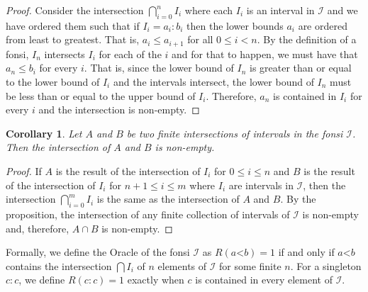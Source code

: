 \documentclass[12pt]{article}
\newtheorem{corollary}{Corollary}
\theoremstyle{remark}
\newcommand{\lt}{\mathord{<}}
\begin{document}
\begin{proof} 
    Consider the intersection $\bigcap_{i=0}^n I_i$ where each $I_i$ is an interval in $\mathcal{I}$ and we have ordered them such that if $I_i = a_i : b_i$ then the lower bounds $a_i$ are ordered from least to greatest. That is,  $a_i \leq a_{i+1}$ for all $0 \leq i < n$. By the definition of a fonsi, $I_n$ intersects $I_i$ for each of the $i$ and for that to happen, we must have that $a_n \leq b_i$ for every $i$. That is, since the lower bound of $I_n$ is greater than or equal to the lower bound of $I_i$ and the intervals intersect, the lower bound of $I_n$ must be less than or equal to the upper bound of $I_i$. Therefore, $a_n$ is contained in $I_i$ for every $i$ and the intersection is non-empty. 
\end{proof}


\begin{corollary}
Let $A$ and $B$ be two finite intersections of intervals in the fonsi $\mathcal{I}$. Then the intersection of $A$ and $B$ is non-empty.
\end{corollary}

\begin{proof}
    If $A$ is the result of the intersection of $I_i$ for $0 \leq i \leq n$ and $B$ is the result of the intersection of $I_i$ for $n+1 \leq i \leq m$ where $I_i$ are intervals in $\mathcal{I}$, then the intersection $\bigcap_{i=0}^m I_i$ is the same as the intersection of $A$ and $B$. By the proposition, the intersection of any finite collection of intervals of $\mathcal{I}$ is non-empty and, therefore, $A \cap B$ is non-empty. 
\end{proof}


Formally, we define the Oracle of the fonsi $\mathcal{I}$ as $R(a \lt b) = 1$ if and only if $a \lt b$ contains the intersection $\bigcap I_i$ of $n$ elements of $\mathcal{I}$ for some finite $n$. For a singleton $c:c$, we define $R(c:c) = 1$ exactly when $c$ is contained in every element of $\mathcal{I}$. 
\end{document}
